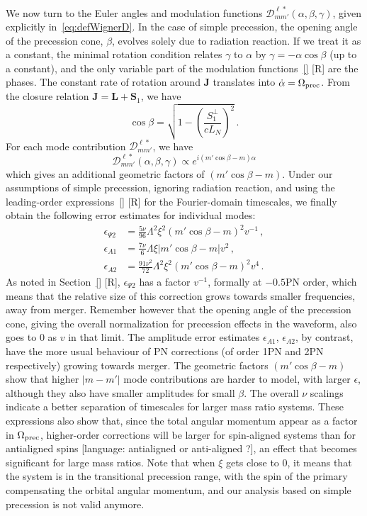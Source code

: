 \documentclass[aps,showpacs,twocolumn,
prd,superscriptaddress,nofootinbib]{revtex4-1}
\newcommand{\be}{\begin{equation}}
\newcommand{\ee}{\end{equation}}
\newcommand\calD{{\mathcal{D}}}
\newcommand{\SM}[1]{{\color{Red} #1}}
\begin{document}
We now turn to the Euler angles and modulation functions $\calD^{\ell *}_{mm'}(\alpha, \beta, \gamma)$, given explicitly in~\eqref{eq:defWignerD}. In the case of simple precession, the opening angle of the precession cone, $\beta$, evolves solely due to radiation reaction. If we treat it as a constant, the minimal rotation condition relates $\gamma$ to $\alpha$ by $\gamma  = -\alpha \cos \beta$ (up to a constant), and the only variable part of the modulation functions~\eqref{} \SM{[R]} are the phases. The constant rate of rotation around $\bm{J}$ translates into $\dot{\alpha} = \Omega_{\rm prec}$. From the closure relation $\bm{J} = \bm{L} + \bm{S}_{1}$, we have
\be\label{eq:betaconst}
	\cos \beta = \sqrt{1 - \left( \frac{S_{1}^{\perp}}{c L_{N}} \right)^{2}}\,.
\ee
For each mode contribution $\calD^{\ell *}_{mm'}$, we have
\be
	\calD^{\ell *}_{mm'} (\alpha, \beta, \gamma) \propto e^{i(m' \cos\beta - m) \alpha}
\ee
which gives an additional geometric factors of $(m' \cos\beta - m)$.
Under our assumptions of simple precession, ignoring radiation reaction, and using the leading-order expressions~\eqref{} \SM{[R]} for the Fourier-domain timescales, we finally obtain the following error estimates for individual modes:
\begin{subequations}
\begin{align}
	\epsilon_{\Psi 2} &= \frac{5\nu}{96} \Lambda^{2} \xi^{2} (m' \cos\beta - m)^{2} v^{-1} \,, \\
	\epsilon_{A 1} &=  \frac{7\nu}{6} \Lambda \xi |m' \cos\beta - m| v^{2} \,, \\
	\epsilon_{A 2} &= \frac{91 \nu^{2}}{72} \Lambda^{2} \xi^{2} (m' \cos\beta - m)^{2} v^{4} \,.
\end{align}
\end{subequations}
As noted in Section~\ref{} \SM{[R]}, $\epsilon_{\Psi 2}$ has a factor $v^{-1}$, formally at $-0.5$PN order, which means that the relative size of this correction grows towards smaller frequencies, away from merger. Remember however that the opening angle of the precession cone, giving the overall normalization for precession effects in the waveform, also goes to 0 as $v$ in that limit. The amplitude error estimates $\epsilon_{A1}$, $\epsilon_{A2}$, by contrast, have the more usual behaviour of PN corrections (of order 1PN and 2PN respectively) growing towards merger. The geometric factors $(m' \cos\beta - m)$ show that higher $|m-m'|$ mode contributions are harder to model, with larger $\epsilon$, although they also have smaller amplitudes for small $\beta$. The overall $\nu$ scalings indicate a better separation of timescales for larger mass ratio systems. These expressions also show that, since the total angular momentum appear as a factor in $\Omega_{\rm prec}$, higher-order corrections will be larger for spin-aligned systems than for antialigned spins \SM{[language: antialigned or anti-aligned ?]}, an effect that becomes significant for large mass ratios. Note that when $\xi$ gets close to 0, it means that the system is in the transitional precession range, with the spin of the primary compensating the orbital angular momentum, and our analysis based on simple precession is not valid anymore.
\end{document}
